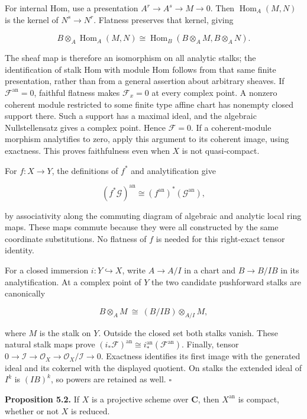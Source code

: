 \documentclass[11pt]{article}
\begin{document}
For internal Hom, use a presentation \(A^r\to A^s\to M\to0\). Then
\(\operatorname{Hom}_A(M,N)\) is the kernel of \(N^s\to N^r\). Flatness
preserves that kernel, giving

\[
B\otimes_A\operatorname{Hom}_A(M,N)
\cong\operatorname{Hom}_B(B\otimes_A M,B\otimes_A N).
\]

The sheaf map is therefore an isomorphism on all analytic stalks; the
identification of stalk Hom with module Hom follows from that same
finite presentation, rather than from a general assertion about
arbitrary sheaves. If \(\mathcal F^{\mathrm{an}}=0\), faithful flatness
makes \(\mathcal F_x=0\) at every complex point. A nonzero coherent
module restricted to some finite type affine chart has nonempty closed
support there. Such a support has a maximal ideal, and the algebraic
Nullstellensatz gives a complex point. Hence \(\mathcal F=0\). If a
coherent-module morphism analytifies to zero, apply this argument to its
coherent image, using exactness. This proves faithfulness even when
\(X\) is not quasi-compact.

For \(f:X\to Y\), the definitions of \(f^*\) and analytification give

\[
(f^*\mathcal G)^{\mathrm{an}}
\cong(f^{\mathrm{an}})^*(\mathcal G^{\mathrm{an}}),
\]

by associativity along the commuting diagram of algebraic and analytic
local ring maps. These maps commute because they were all constructed by
the same coordinate substitutions. No flatness of \(f\) is needed for
this right-exact tensor identity.

For a closed immersion \(i:Y\hookrightarrow X\), write \(A\to A/I\) in a
chart and \(B\to B/IB\) in its analytification. At a complex point of
\(Y\) the two candidate pushforward stalks are canonically

\[
B\otimes_A M
\ \cong\ (B/IB)\otimes_{A/I}M,
\]

where \(M\) is the stalk on \(Y\). Outside the closed set both stalks
vanish. These natural stalk maps prove
\((i_*\mathcal F)^{\mathrm{an}}\cong i^{\mathrm{an}}_*(\mathcal F^{\mathrm{an}})\).
Finally, tensor
\(0\to\mathcal I\to\mathcal O_X\to\mathcal O_X/\mathcal I\to0\).
Exactness identifies its first image with the generated ideal and its
cokernel with the displayed quotient. On stalks the extended ideal of
\(I^k\) is \((IB)^k\), so powers are retained as well. \(\square\)

\textbf{Proposition 5.2.} If \(X\) is a projective scheme over
\(\mathbf C\), then \(X^{\mathrm{an}}\) is compact, whether or not \(X\)
is reduced.
\end{document}
